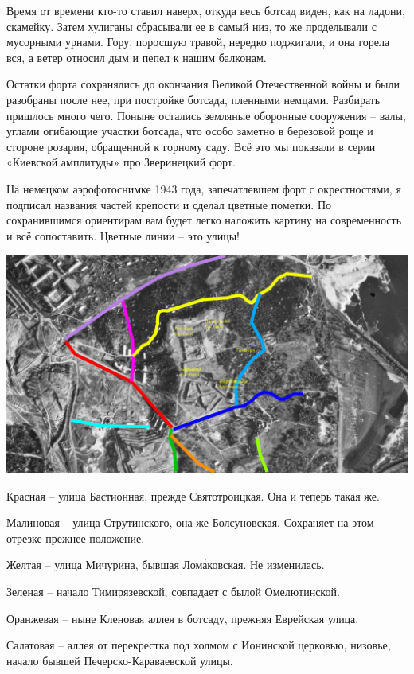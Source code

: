 Время от времени кто-то ставил наверх, откуда весь ботсад виден, как на ладони, скамейку. Затем хулиганы сбрасывали ее в самый низ, то же проделывали с мусорными урнами. Гору, поросшую травой, нередко поджигали, и она горела вся, а ветер относил дым и пепел к нашим балконам.

Остатки форта сохранялись до окончания Великой Отечественной войны и были разобраны после нее, при постройке ботсада, пленными немцами. Разбирать пришлось много чего. Поныне остались земляные оборонные сооружения – валы, углами огибающие участки ботсада, что особо заметно в березовой роще и стороне розария, обращенной к горному саду. Всё это мы показали в серии «Киевской амплитуды» про Зверинецкий форт. 

На немецком аэрофотоснимке 1943 года, запечатлевшем форт с окрестностями, я подписал названия частей крепости и сделал цветные пометки. По сохранившимся ориентирам вам будет легко наложить картину на современность и всё сопоставить. Цветные линии – это улицы!

\begin{center}
\includegraphics[width=\textwidth]{chast-vosp/zver/zver-krep-map-color.jpg}
\end{center}

Красная – улица Бастионная, прежде Святотроицкая. Она и теперь такая же.

Малиновая – улица Струтинского, она же Болсуновская. Сохраняет на этом отрезке прежнее положение.

Желтая – улица Мичурина, бывшая Лом\'аковская. Не изменилась.

Зеленая – начало Тимирязевской, совпадает с былой Омелютинской.

Оранжевая – ныне Кленовая аллея в ботсаду, прежняя Еврейская улица.

Салатовая – аллея от перекрестка под холмом с Ионинской церковью, низовье, начало бывшей Печерско-Кара\-ваевской улицы.

